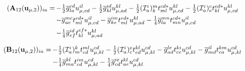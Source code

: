 \begin{subappendices}
\begin{equation}
    \begin{array}{r@{\,}l}
        (\mathbf{A}_{12}(\mathbf{u}_{\mu,2}))_{ia}
        =
        &
        -
        \tfrac{1}{2}
        \overline{g}_{la}^{cd}
        u_{\mu,cd}^{il}
        -
        \tfrac{1}{2}
        \overline{g}_{kl}^{id}
        u_{\mu,ad}^{kl}
        -
        \tfrac{1}{2}
        (\mathcal{I}_a^i)_k^m
        t_{ml}^{cd*}
        u_{\mu,cd}^{kl}
        -
        \tfrac{1}{2}
        (\mathcal{I}_a^i)_e^c
        t_{kl}^{ed*}
        u_{\mu,cd}^{kl}
        \\[5pt]
        &
        -
        \overline{g}_{ae}^{mc}
        t_{ml}^{ed*}
        u_{\mu,cd}^{il}
        -
        \overline{g}_{ke}^{im}
        t_{ml}^{ed*}
        u_{\mu,ad}^{kl}
        -
        \tfrac{1}{4}
        \overline{g}_{la}^{mn}
        t_{mn}^{cd*}
        u_{\mu,cd}^{il}
        \\[5pt]
        &
        -
        \tfrac{1}{4}
        \overline{g}_{ef}^{id}
        t_{kl}^{ef*}
        u_{\mu,ad}^{kl}
    \end{array}
\end{equation}

\begin{equation}
    \begin{array}{r@{\,}l}
        (\mathbf{B}_{12}(\mathbf{u}_{\mu,2}))_{ia}
        =
        &
        -
        \tfrac{1}{2}
        (\mathcal{I}_a^i)_m^k
        t_{cd}^{ml}
        u_{\mu,kl}^{cd}
        -
        \tfrac{1}{2}
        (\mathcal{I}_a^i)_c^e
        t_{ed}^{kl}
        u_{\mu,kl}^{cd}
        -
        \overline{g}_{ad}^{le}
        t_{ce}^{ki}
        u_{\mu,kl}^{cd}
        -
        \overline{g}_{md}^{il}
        t_{ca}^{km}
        u_{\mu,kl}^{cd}
        \\[5pt]
        &
        -
        \tfrac{1}{4}
        \overline{g}_{ma}^{kl}
        t_{cd}^{im}
        u_{\mu,kl}^{cd}
        -
        \tfrac{1}{4}
        \overline{g}_{cd}^{ie}
        t_{ae}^{kl}
        u_{\mu,kl}^{cd}
    \end{array}
\end{equation}


\end{subappendices}

